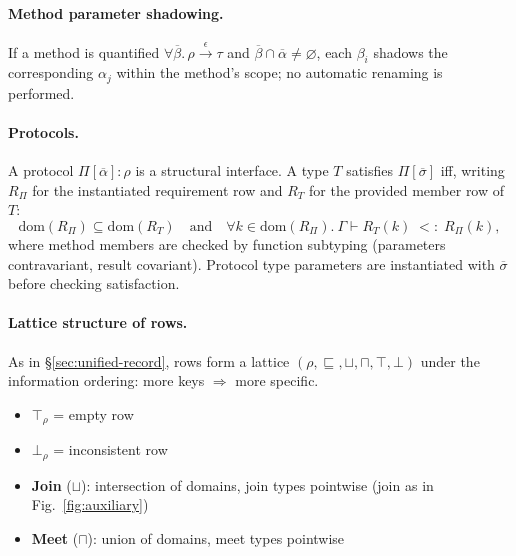 \paragraph{Method parameter shadowing.}
If a method is quantified $\forall\overline{\beta}.\,\rho \xrightarrow{\epsilon} \tau$ and $\overline{\beta} \cap \overline{\alpha} \neq \varnothing$, each $\beta_i$ shadows the corresponding $\alpha_j$ within the method’s scope; no automatic renaming is performed.

\paragraph{Protocols.}
A protocol $\Pi[\overline{\alpha}]: \rho$ is a structural interface.
A type $T$ satisfies $\Pi[\overline{\sigma}]$ iff, writing $R_\Pi$ for the instantiated requirement row and $R_T$ for the provided member row of $T$:
\[
\mathrm{dom}(R_\Pi) \subseteq \mathrm{dom}(R_T)
\quad\text{and}\quad
\forall k \in \mathrm{dom}(R_\Pi).\ \Gamma \vdash R_T(k) \;<:\; R_\Pi(k),
\]
where method members are checked by function subtyping (parameters contravariant, result covariant). Protocol type parameters are instantiated with $\overline{\sigma}$ before checking satisfaction.

\paragraph{Lattice structure of rows.}
As in \S\ref{sec:unified-record}, rows form a lattice $(\mathcal{\rho}, \sqsubseteq, \sqcup, \sqcap, \top, \bot)$ under the information ordering: more keys $\Rightarrow$ more specific.
\begin{itemize}
  \item $\top_\rho$ = empty row
  \item $\bot_\rho$ = inconsistent row
  \item \textbf{Join} ($\sqcup$): intersection of domains, join types pointwise (join as in Fig.~\ref{fig:auxiliary})
  \item \textbf{Meet} ($\sqcap$): union of domains, meet types pointwise
\end{itemize}

